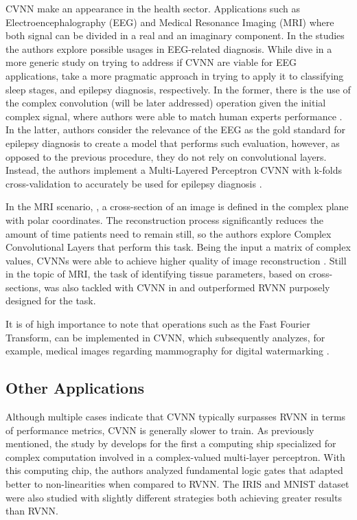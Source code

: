 \gls{CVNN} make an appearance in the health sector. Applications such as Electroencephalography (EEG) and Medical Resonance Imaging (MRI) where both signal can be divided in a real and an imaginary component. In the studies \parencite{du2023hybrid, zhang2017sleepsignal, peker2016eegsignal} the authors explore possible usages in EEG-related diagnosis. While \parencite{du2023hybrid} dive in a more generic study on trying to address if \gls{CVNN} are viable for EEG applications, \parencite{zhang2017sleepsignal, peker2016eegsignal} take a more pragmatic approach in trying to apply it to classifying sleep stages, and epilepsy diagnosis, respectively. In the former, there is the use of the complex convolution (will be later addressed) operation given the initial complex signal, where authors were able to match human experts performance \parencite{zhang2017sleepsignal}. In the latter, authors consider the relevance of the EEG as the gold standard for epilepsy diagnosis \parencite{pillai2006epi} to create a model that performs such evaluation, however, as opposed to the previous procedure, they do not rely on convolutional layers. Instead, the authors implement a Multi-Layered Perceptron \parencite{rumelhart1986} \gls{CVNN} with k-folds cross-validation to accurately be used for epilepsy diagnosis \parencite{peker2016eegsignal}.

In the MRI scenario, \parencite{cole2020analysis, cole2021analysis}, a cross-section of an image is defined in the complex plane with polar coordinates. The reconstruction process significantly reduces the amount of time patients need to remain still, so the authors explore Complex Convolutional Layers that perform this task. Being the input a matrix of complex values, \gls{CVNN}s were able to achieve higher quality of image reconstruction \parencite{cole2020analysis, cole2021analysis}. Still in the topic of MRI, the task of identifying tissue parameters, based on cross-sections, was also tackled with \gls{CVNN} in \parencite{virtue2017mribettercvnn} and outperformed \gls{RVNN} purposely designed for the task.

It is of high importance to note that operations such as the Fast Fourier Transform, can be implemented in \gls{CVNN}, which subsequently analyzes, for example, medical images regarding mammography for digital watermarking \textcite{olanrewaju2011watermarkmed}.

\subsection{Other Applications}
Although multiple cases indicate that CVNN typically surpasses RVNN in terms of performance metrics, CVNN is generally slower to train. As previously mentioned, the study by \textcite{zhang2021optical} develops for the first a computing ship specialized for complex computation involved in a complex-valued multi-layer perceptron. With this computing chip, the authors analyzed fundamental logic gates that adapted better to non-linearities when compared to RVNN. The IRIS \parencite{fisher1936} and MNIST \parencite{lecun1998mnist} dataset were also studied with slightly different strategies both achieving greater results than RVNN.

